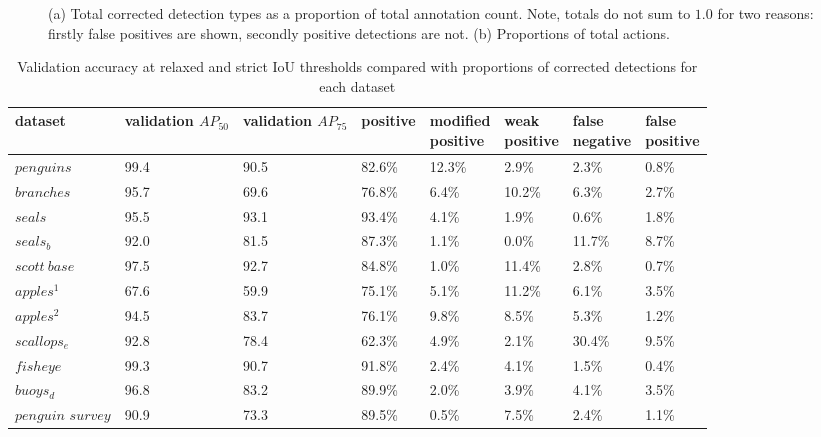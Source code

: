 \begin{figure}[ht!]
\caption {(a) Total corrected detection types as a proportion of total annotation count. Note, totals do not sum to $1.0$ for two reasons: firstly false positives are shown, secondly positive detections are not. (b) Proportions of total actions. }
\label{fig:actions_dataset}
\end{figure}

\begin{table}[h!]
\caption{Validation accuracy at relaxed and strict IoU thresholds compared with proportions of corrected detections for each dataset}
\label{tab:validation_corrections}
\begin{adjustbox}{max width=\textwidth}
\begin{tabular}{llllllll}
dataset           & \shortstack{validation \\ $AP_{50}$} & \shortstack{validation  \\ $AP_{75}$} & positive & \shortstack{modified\\ positive} & \shortstack{weak\\ positive} & \shortstack{false \\ negative} & \shortstack{false \\ positive} \\
\toprule
$penguins$        & 99.4      & 90.5      & 82.6\%   & 12.3\%            & 2.9\%         & 2.3\%          & 0.8\%          \\
$branches$        & 95.7      & 69.6      & 76.8\%   & 6.4\%             & 10.2\%        & 6.3\%          & 2.7\%          \\
$seals$           & 95.5      & 93.1      & 93.4\%   & 4.1\%             & 1.9\%         & 0.6\%          & 1.8\%          \\
$seals_b$         & 92.0      & 81.5      & 87.3\%   & 1.1\%             & 0.0\%         & 11.7\%         & 8.7\%          \\
$scott\:base$     & 97.5      & 92.7      & 84.8\%   & 1.0\%             & 11.4\%        & 2.8\%          & 0.7\%          \\
$apples^1$        & 67.6      & 59.9      & 75.1\%   & 5.1\%             & 11.2\%        & 6.1\%          & 3.5\%          \\
$apples^2$        & 94.5      & 83.7      & 76.1\%   & 9.8\%             & 8.5\%         & 5.3\%          & 1.2\%          \\
$scallops_e$      & 92.8      & 78.4      & 62.3\%   & 4.9\%             & 2.1\%         & 30.4\%         & 9.5\%          \\
$fisheye$         & 99.3      & 90.7      & 91.8\%   & 2.4\%             & 4.1\%         & 1.5\%          & 0.4\%          \\
$buoys_d$         & 96.8      & 83.2      & 89.9\%   & 2.0\%             & 3.9\%         & 4.1\%          & 3.5\%          \\
\shortstack {$penguin$ \\ $survey$} & 90.9      & 73.3      & 89.5\%   & 0.5\%             & 7.5\%         & 2.4\%          & 1.1\%        \\ 
\bottomrule
\end{tabular}
\end{adjustbox}
\end{table}

